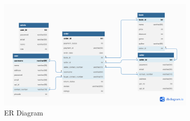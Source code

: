 \documentclass[12pt]{article}
\begin{document}
\begin{figure}[h]
\centering
\includegraphics[width=0.85\textwidth]{schema_diagram.png}
\caption{ER Diagram}
\end{figure}
\end{document}
